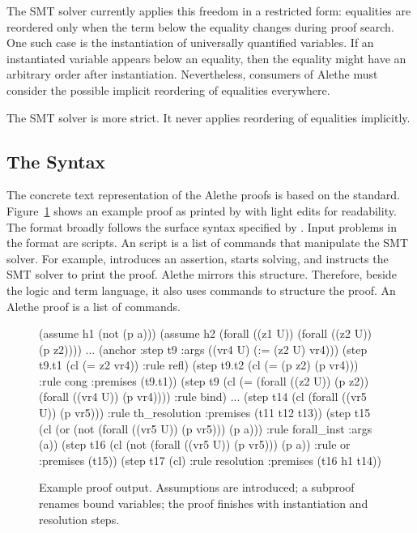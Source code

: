 \documentclass{scrartcl}
\begin{document}
The SMT solver {\verit} currently applies this freedom in a restricted
form: equalities are reordered only
when the term below the equality changes during proof search. One such
case is the instantiation of universally quantified variables. If an
instantiated variable appears below an equality, then the equality might
have an arbitrary order after instantiation.
Nevertheless, consumers of Alethe must consider the possible
implicit reordering of equalities everywhere.

The SMT solver {\cvcfive} is more strict.  It never applies reordering of
equalities implicitly.

\subsection{The Syntax}\label{sec:alethe:syntax}

The concrete text representation of the Alethe proofs
is based on the {\smtlib} standard. Figure~\ref{fig:proof_ex} shows an
example proof as printed by {\verit} with light edits for readability.
%
The format broadly follows the surface syntax specified by {\smtlib}.
%
Input problems in the {\smtlib} format are scripts.  An {\smtlib} script
is a list of commands that manipulate the SMT solver.  For example,
 introduces an assertion,  starts
solving, and  instructs the SMT solver to print the
proof.
%
Alethe mirrors this structure. Therefore, beside the {\smtlib}
logic and term language, it also uses commands to structure the proof.
An Alethe proof is a list of commands.

\begin{figure}[t]
    \begin{AletheVerb}
(assume h1 (not (p a)))
(assume h2 (forall ((z1 U)) (forall ((z2 U)) (p z2))))
...
(anchor :step t9 :args ((vr4 U) (:= (z2 U) vr4)))
(step t9.t1 (cl (= z2 vr4)) :rule refl)
(step t9.t2 (cl (= (p z2) (p vr4)))
         :rule cong :premises (t9.t1))
(step t9 (cl (= (forall ((z2 U)) (p z2))
                (forall ((vr4 U)) (p vr4))))
         :rule bind)
...
(step t14 (cl (forall ((vr5 U)) (p vr5)))
          :rule th_resolution :premises (t11 t12 t13))
(step t15 (cl (or (not (forall ((vr5 U)) (p vr5)))
                  (p a)))
          :rule forall_inst :args (a))
(step t16 (cl (not (forall ((vr5 U)) (p vr5))) (p a))
          :rule or :premises (t15))
(step t17 (cl) :rule resolution :premises (t16 h1 t14))
    \end{AletheVerb}
\caption{Example proof output. Assumptions are
  introduced;   a subproof renames bound variables; the proof finishes with
  instantiation and resolution steps.}
\label{fig:proof_ex}
\end{figure}
\end{document}
